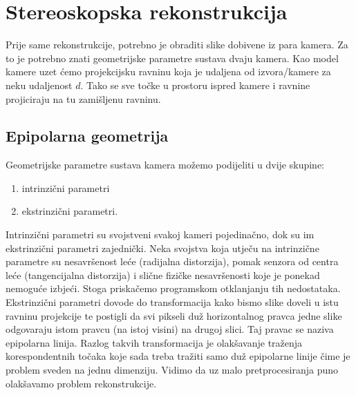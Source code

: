 \documentclass[utf8, zavrsni, numeric]{fer}
\begin{document}
\chapter{Stereoskopska rekonstrukcija}

Prije same rekonstrukcije, potrebno je obraditi slike dobivene iz para kamera. Za to je potrebno znati geometrijske parametre sustava dvaju kamera. Kao model kamere uzet ćemo
projekcijsku ravninu koja je udaljena od izvora/kamere za neku udaljenost $d$. Tako se sve točke u prostoru ispred kamere i ravnine projiciraju na tu zamišljenu ravninu.

\section{Epipolarna geometrija}


Geometrijske parametre sustava kamera možemo podijeliti u dvije skupine:
\begin{enumerate}
  \item intrinzični parametri
  \item ekstrinzični parametri.
\end{enumerate}

Intrinzični parametri su svojstveni svakoj kameri pojedinačno, dok su im ekstrinzični parametri zajednički. Neka svojstva koja utječu na intrinzične parametre su nesavršenost leće (radijalna distorzija), pomak senzora
od centra leće (tangencijalna distorzija) i slične fizičke nesavršenosti koje je ponekad nemoguće izbjeći. Stoga priskačemo programskom otklanjanju tih nedostataka.
Ekstrinzični parametri dovode do transformacija kako bismo slike doveli u istu ravninu projekcije te postigli da svi pikseli duž horizontalnog pravca jedne slike odgovaraju istom pravcu (na istoj visini) na drugoj slici. Taj pravac se naziva epipolarna linija. Razlog takvih transformacija je olakšavanje traženja korespondentnih točaka koje sada treba tražiti samo duž epipolarne linije čime je problem sveden na jednu dimenziju. Vidimo da uz malo pretprocesiranja puno olakšavamo problem rekonstrukcije.
\end{document}
